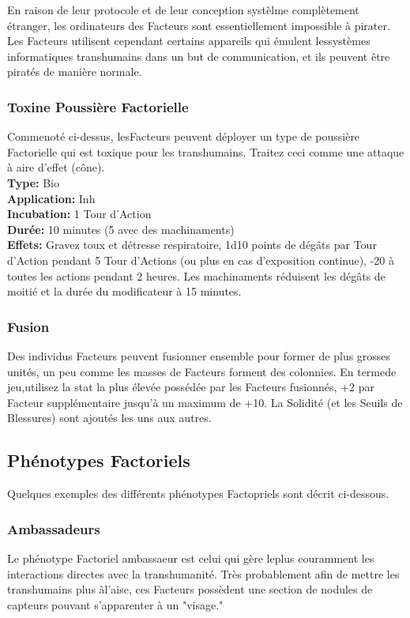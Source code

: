 {En raison de leur protocole et de leur conception systèlme complètement étranger, les ordinateurs des Facteurs sont essentiellement impossible à pirater. Les Facteurs utilisent cependant certains appareils qui émulent lessystèmes informatiques transhumains dans un but de communication, et ils peuvent être piratés de manière normale. 

\subsubsection{Toxine Poussière Factorielle} 

Commenoté ci-dessus, lesFacteurs peuvent déployer un type de poussière Factorielle qui est toxique pour les transhumains. Traitez ceci comme une attaque à aire d'effet (cône). \\ \textbf{Type:} Bio \\ \textbf{Application:} Inh \\ \textbf{Incubation:} 1 Tour d'Action\\ \textbf{Durée:} 10 minutes (5 avec des machinaments) \\ \textbf{Effets:} Gravez toux et détresse respiratoire, 1d10 points de dégâts par Tour d'Action pendant 5 Tour d'Actions (ou plus en cas d'exposition continue), -20 à toutes les actions pendant 2 heures. Les machinaments réduisent les dégâts de moitié et la durée du modificateur à 15 minutes. 

\subsubsection{Fusion} 

Des individus Facteurs peuvent fusionner ensemble pour former de plus grosses unités, un peu comme les masses de Facteurs forment des colonnies. En termede jeu,utilisez la stat la plus élevée possédée par les Facteurs fusionnés, +2 par Facteur supplémentaire jusqu'à un maximum de +10. La Solidité (et les Seuils de Blessures) sont ajoutés les uns aux autres. 

\subsection{Phénotypes Factoriels} 

Quelques exemples des différents phénotypes Factopriels sont décrit ci-dessous. 

\subsubsection{Ambassadeurs} Le phénotype Factoriel ambassaeur est celui qui gère leplus couramment les interactions directes avec la transhumanité. Très probablement afin de mettre les transhumains plus àl'aise, ces Facteurs possèdent une section de nodules de capteurs pouvant s'apparenter à un "visage." \\ \begin{tabular}{|l|l|l|l|l|l|l|l|} \hline


\end{tabular}}
